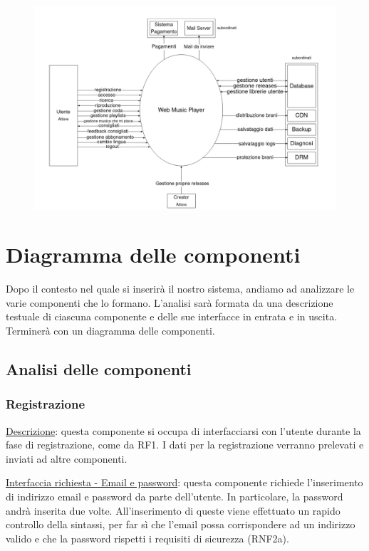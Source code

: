 \documentclass[a4paper,12pt]{article}
\begin{document}
\begin{figure}[htp]
    \centering
    \includegraphics[width=\textwidth]{diagrams/context.png}
\end{figure}

\newpage
\section{Diagramma delle componenti}

Dopo il contesto nel quale si inserirà il nostro sistema, andiamo ad analizzare le varie componenti che lo formano. L'analisi sarà formata da una descrizione testuale di ciascuna componente e delle sue interfacce in entrata e in uscita. Terminerà con un diagramma delle componenti.

\subsection{Analisi delle componenti}

\subsubsection{Registrazione}

\underline{Descrizione}: questa componente si occupa di interfacciarsi con l’utente durante la fase di registrazione, come da RF1. I dati per la registrazione verranno prelevati e inviati ad altre componenti.

\underline{Interfaccia richiesta - Email e password}: questa componente richiede l'inserimento di indirizzo email e password da parte dell'utente. In particolare, la password andrà inserita due volte. All'inserimento di queste viene effettuato un rapido controllo della sintassi, per far sì che l'email possa corrispondere ad un indirizzo valido e che la password rispetti i requisiti di sicurezza (RNF2a).
\end{document}
